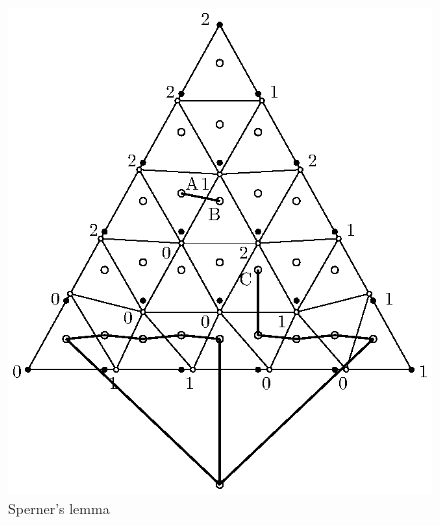 \documentclass[reqno]{amsart}
\begin{document}
\begin{figure}[ht!]
\begin{center}
\includegraphics{sperner2.eps}
\end{center}
	\vspace*{-.3cm}
	\caption{Sperner's lemma}
	\label{tria2}
\end{figure}
\end{document}
